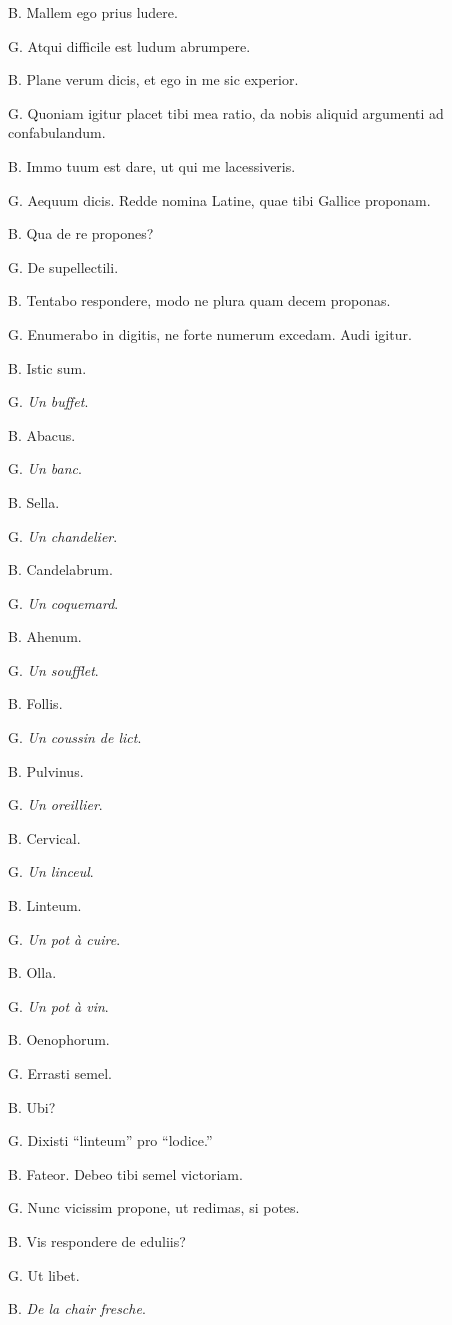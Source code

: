 \documentclass{article}
\newcommand{\fr}[1]{\foreignlanguage{french}{\emph{#1}}}
\begin{document}
B. Mallem ego prius ludere.

G. Atqui difficile est ludum abrumpere.

B. Plane verum dicis, et ego in me sic experior.

G. Quoniam igitur placet tibi mea ratio, da nobis aliquid argumenti ad confabulandum.

B. Immo tuum est dare, ut qui me lacessiveris.

G. Aequum dicis. Redde nomina Latine, quae tibi Gallice proponam.

B. Qua de re propones?

G. De supellectili.

B. Tentabo respondere, modo ne plura quam decem proponas.

G. Enumerabo in digitis, ne forte numerum excedam. Audi igitur.

B. Istic sum.

G. \fr{Un buffet}.

B. Abacus.

G. \fr{Un banc}.

B. Sella.

G. \fr{Un chandelier}.

B. Candelabrum.

G. \fr{Un coquemard}.

B. Ahenum.

G. \fr{Un soufflet}.

B. Follis.

G. \fr{Un coussin de lict}.

B. Pulvinus.

G. \fr{Un oreillier}. 

B. Cervical.

G. \fr{Un linceul}.

B. Linteum.

G. \fr{Un pot à cuire}.

B. Olla.

G. \fr{Un pot à vin}.

B. Oenophorum.
 
G. Errasti semel.

B. Ubi?

G. Dixisti ``linteum'' pro ``lodice.''

B. Fateor. Debeo tibi semel victoriam.

G. Nunc vicissim propone, ut redimas, si potes.

B. Vis respondere de eduliis?

G. Ut libet.

B. \fr{De la chair fresche}.
\end{document}
